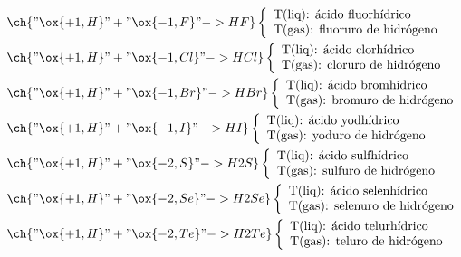 \begin{align*}
	&\ch{"\ox{+1,H}" + "\ox{-1,F}" -> HF}\left\{\begin{array}{l}
		\text{T(liq): ácido fluorhídrico} \\
		\text{T(gas): fluoruro de hidrógeno}
	\end{array}\right. \\
	&\ch{"\ox{+1,H}" + "\ox{-1,Cl}" -> HCl}\left\{\begin{array}{l}
		\text{T(liq): ácido clorhídrico} \\
		\text{T(gas): cloruro de hidrógeno}
	\end{array}\right. \\
	&\ch{"\ox{+1,H}" + "\ox{-1,Br}" -> HBr}\left\{\begin{array}{l}
		\text{T(liq): ácido bromhídrico} \\
		\text{T(gas): bromuro de hidrógeno}
	\end{array}\right. \\
	&\ch{"\ox{+1,H}" + "\ox{-1,I}" -> HI}\left\{\begin{array}{l}
		\text{T(liq): ácido yodhídrico} \\
		\text{T(gas): yoduro de hidrógeno}
	\end{array}\right. \\
	&\ch{"\ox{+1,H}" + "\ox{-2,S}" -> H2S}\left\{\begin{array}{l}
		\text{T(liq): ácido sulfhídrico} \\
		\text{T(gas): sulfuro de hidrógeno}
	\end{array}\right. \\
	&\ch{"\ox{+1,H}" + "\ox{-2,Se}" -> H2Se}\left\{\begin{array}{l}
		\text{T(liq): ácido selenhídrico} \\
		\text{T(gas): selenuro de hidrógeno}
	\end{array}\right. \\
	&\ch{"\ox{+1,H}" + "\ox{-2,Te}" -> H2Te}\left\{\begin{array}{l}
		\text{T(liq): ácido telurhídrico} \\
		\text{T(gas): teluro de hidrógeno}
	\end{array}\right. \\
\end{align*}